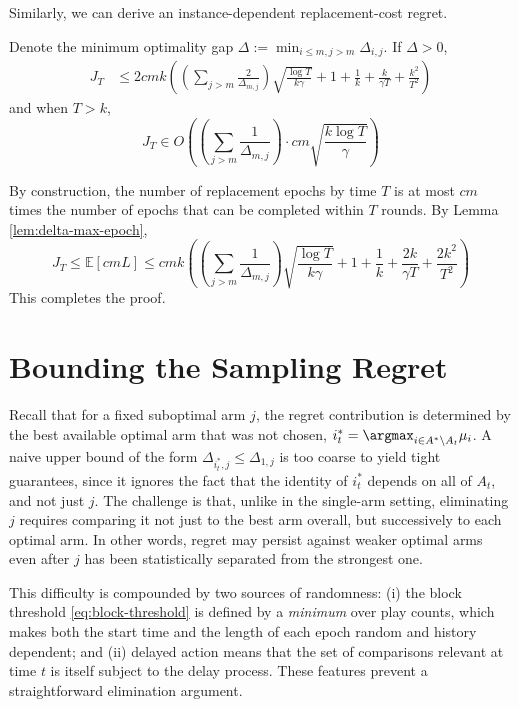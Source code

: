 \documentclass[opre,blindrev]{informs3}
\newcommand{\bE}[1]{{\mathbb{E}\left[#1\right]}}
\begin{document}
\begin{APPENDICES}
Similarly, we can derive an instance-dependent replacement-cost regret.
\begin{lemma}\label{lem:delta-sc-bound-final}
    Denote the minimum optimality gap \(\Delta:=\min_{i\leq m, j>m}\Delta_{i,j}\). If \(\Delta>0\),
    \begin{align*}
        J_T&\leq 2cmk\left(\left(\sum_{j>m}\frac{2}{\Delta_{m,j}}\right)\sqrt{\frac{\log T}{k\gamma}}+1+\frac{1}{k}+\frac{k}{\gamma T}+\frac{k^2}{T^2}\right)
    \end{align*}
    and when \(T>k\),
    \[J_T\in O\left(\left(\sum_{j>m}\frac{1}{\Delta_{m,j}}\right)\cdot cm\sqrt{\frac{k\log T}{\gamma}}\right)\]
\end{lemma}
    By construction, the number of replacement epochs by time \(T\) is at most \(cm\) times the number of epochs that can be completed within \(T\) rounds. By Lemma \ref{lem:delta-max-epoch},
    \[J_T\leq \bE{cmL}\leq cmk\left(\left(\sum_{j>m}\frac{1}{\Delta_{m,j}}\right)\sqrt{\frac{\log T}{k\gamma}}+1+\frac{1}{k}+\frac{2k}{\gamma T}+\frac{2k^2}{T^2}\right)\]
This completes the proof. 
\Halmos  


\section{Bounding the Sampling Regret}\label{sec:sampling_proof}
Recall that for a fixed suboptimal arm \(j\), the regret contribution is determined by the best available optimal arm that was not chosen,
$i^*_t = \argmax_{i \in A^* \setminus A_t} \mu_i$.
A naive upper bound of the form \(\Delta_{i^*_t,j} \leq \Delta_{1,j}\) is too coarse to yield tight guarantees, since it ignores the fact that the identity of \(i^*_t\) depends on all of \(A_t\), and not just \(j\). The challenge is that, unlike in the single-arm setting, eliminating \(j\) requires comparing it not just to the best arm overall, but successively to each optimal arm. In other words, regret may persist against weaker optimal arms even after \(j\) has been statistically separated from the strongest one.

This difficulty is compounded by two sources of randomness: (i) the block threshold \eqref{eq:block-threshold} is defined by a \emph{minimum} over play counts, which makes both the start time and the length of each epoch random and history dependent; and (ii) delayed action means that the set of comparisons relevant at time \(t\) is itself subject to the delay process. These features prevent a straightforward elimination argument.


\end{APPENDICES}
\end{document}

